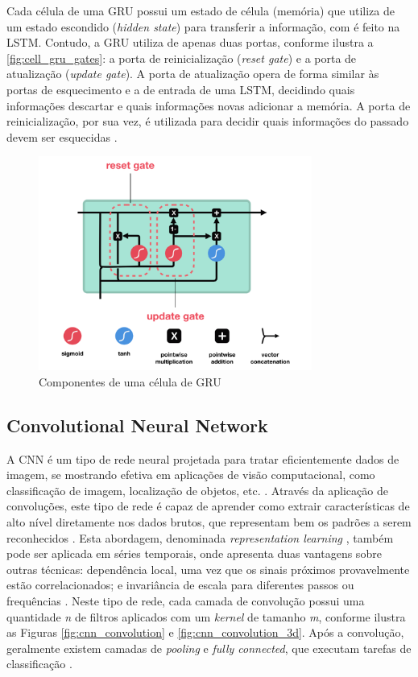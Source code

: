 Cada célula de uma GRU possui um estado de célula (memória) que utiliza de um estado escondido (\textit{hidden state}) para transferir a informação, com é feito na LSTM. Contudo, a GRU utiliza de apenas duas portas, conforme ilustra a \autoref{fig:cell_gru_gates}: a porta de reinicialização (\textit{reset gate}) e a porta de atualização (\textit{update gate}). A porta de atualização opera de forma similar às portas de esquecimento e a de entrada de uma LSTM, decidindo quais informações descartar e quais informações novas adicionar a memória. A porta de reinicialização, por sua vez, é utilizada para decidir quais informações do passado devem ser esquecidas \cite{Phi2020}.

\begin{figure}[h]
  \centering
  \caption{Componentes de uma célula de GRU}
   \label{fig:cell_gru_gates}
   \includegraphics[width=0.8\textwidth]{figuras/fig_10.png}
\end{figure}

\subsection{Convolutional Neural Network}

A CNN é um tipo de rede neural projetada para tratar eficientemente dados de imagem, se mostrando efetiva em aplicações de visão computacional, como classificação de imagem, localização de objetos, etc. \cite{Brownlee2018}. Através da aplicação de convoluções, este tipo de rede é capaz de aprender como extrair características de alto nível diretamente nos dados brutos, que representam bem os padrões a serem reconhecidos \cite{Dixon2019,Goodfellow2016}. Esta abordagem, denominada \textit{representation learning} \cite{Brownlee2018}, também pode ser aplicada em séries temporais, onde apresenta duas vantagens sobre outras técnicas: dependência local, uma vez que os sinais próximos provavelmente estão correlacionados; e invariância de escala para diferentes passos ou frequências \cite{Wang2019}. Neste tipo de rede, cada camada de convolução possui uma quantidade \emph{n} de filtros aplicados com um \textit{kernel} de tamanho \emph{m}, conforme ilustra as Figuras \ref{fig:cnn_convolution} e \ref{fig:cnn_convolution_3d}. Após a convolução, geralmente existem camadas de \textit{pooling} e \textit{fully connected}, que executam tarefas de classificação \cite{Wang2019}.

